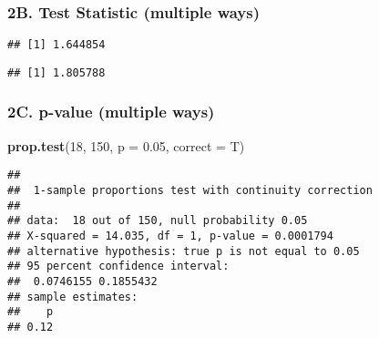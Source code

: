 \documentclass[]{article}
\newenvironment{Shaded}{\begin{snugshade}}{\end{snugshade}}
\newcommand{\CommentTok}[1]{\textcolor[rgb]{0.56,0.35,0.01}{\textit{#1}}}
\newcommand{\DataTypeTok}[1]{\textcolor[rgb]{0.13,0.29,0.53}{#1}}
\newcommand{\DecValTok}[1]{\textcolor[rgb]{0.00,0.00,0.81}{#1}}
\newcommand{\FloatTok}[1]{\textcolor[rgb]{0.00,0.00,0.81}{#1}}
\newcommand{\KeywordTok}[1]{\textcolor[rgb]{0.13,0.29,0.53}{\textbf{#1}}}
\newcommand{\NormalTok}[1]{#1}
\newcommand{\OperatorTok}[1]{\textcolor[rgb]{0.81,0.36,0.00}{\textbf{#1}}}
\newcommand{\StringTok}[1]{\textcolor[rgb]{0.31,0.60,0.02}{#1}}
\begin{document}
\hypertarget{b.-test-statistic-multiple-ways}{%
\subsubsection{2B. Test Statistic (multiple
ways)}\label{b.-test-statistic-multiple-ways}}

\begin{Shaded}
\end{Shaded}

\begin{verbatim}
## [1] 1.644854
\end{verbatim}

\begin{Shaded}
\end{Shaded}

\begin{verbatim}
## [1] 1.805788
\end{verbatim}

\hypertarget{c.-p-value-multiple-ways}{%
\subsubsection{2C. p-value (multiple
ways)}\label{c.-p-value-multiple-ways}}

\begin{Shaded}
\begin{Highlighting}[]
\KeywordTok{prop.test}\NormalTok{(}\DecValTok{18}\NormalTok{, }\DecValTok{150}\NormalTok{, }\DataTypeTok{p =} \FloatTok{0.05}\NormalTok{, }\DataTypeTok{correct =}\NormalTok{ T) }
\end{Highlighting}
\end{Shaded}

\begin{verbatim}
## 
##  1-sample proportions test with continuity correction
## 
## data:  18 out of 150, null probability 0.05
## X-squared = 14.035, df = 1, p-value = 0.0001794
## alternative hypothesis: true p is not equal to 0.05
## 95 percent confidence interval:
##  0.0746155 0.1855432
## sample estimates:
##    p 
## 0.12
\end{verbatim}
\end{document}

